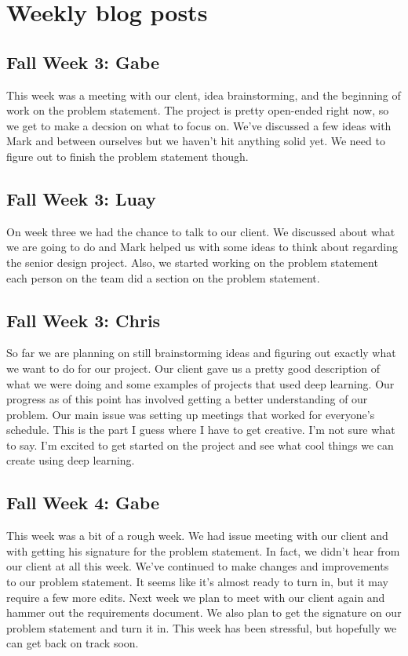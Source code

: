 \documentclass[onecolumn, draftclsnofoot,10pt, compsoc]{IEEEtran}
\begin{document}
\section{Weekly blog posts}
\subsection{Fall Week 3: Gabe}
This week was a meeting with our clent, idea brainstorming, and the beginning of work on the problem statement. The project is pretty open-ended right now, so we get to make a decsion on what to focus on. We've discussed a few ideas with Mark and between ourselves but we haven't hit anything solid yet. We need to figure out to finish the problem statement though.
\subsection{Fall Week 3: Luay}
On week three we had the chance to talk to our client. We discussed about what we are going to do and Mark helped us with some ideas to think about regarding the senior design project. Also, we started working on the problem statement each person on the team did a section on the problem statement.
\subsection{Fall Week 3: Chris}
So far we are planning on still brainstorming ideas and figuring out exactly what we want to do for our project. Our client gave us a pretty good description of what we were doing and some examples of projects that used deep learning. Our progress as of this point has involved getting a better understanding of our problem. Our main issue was setting up meetings that worked for everyone's schedule. This is the part I guess where I have to get creative. I'm not sure what to say. I'm excited to get started on the project and see what cool things we can create using deep learning.
\subsection{Fall Week 4: Gabe}
This week was a bit of a rough week. We had issue meeting with our client and with getting his signature for the problem statement. In fact, we didn't hear from our client at all this week. We've continued to make changes and improvements to our problem statement. It seems like it's almost ready to turn in, but it may require a few more edits. Next week we plan to meet with our client again and hammer out the requirements document. We also plan to get the signature on our problem statement and turn it in. This week has been stressful, but hopefully we can get back on track soon.
\end{document}
